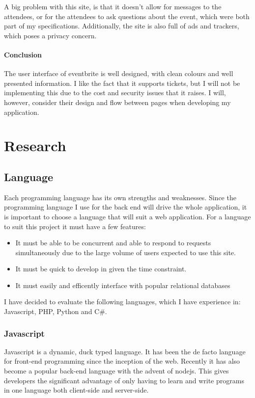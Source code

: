 \documentclass[a4paper,oneside,12pt]{report}
\begin{document}
	A big problem with this site, is that it doesn't allow for messages to the attendees, or for the attendees to ask questions about the event, which were both part of my specifications. Additionally, the site is also full of ads and trackers, which poses a privacy concern.

	\subsubsection{Conclusion}
	The user interface of eventbrite is well designed, with clean colours and well presented information. I like the fact that it supports tickets, but I will not be implementing this due to the cost and security issues that it raises. I will, however, consider their design and flow between pages when developing my application.


	\chapter{Research}

	\section{Language}
	Each programming language has its own strengths and weaknesses. Since the programming language I use for the back end will drive the whole application, it is important to choose a language that will suit a web application. For a language to suit this project it must have a few features:

	\begin{itemize}
		\item It must be able to be concurrent and able to respond to requests simultaneously due to the large volume of users expected to use this site.
		\item It must be quick to develop in given the time constraint.
		\item It must easily and efficently interface with popular relational databases
	\end{itemize}

	I have decided to evaluate the following languages, which I have experience in: Javascript, PHP, Python and C\#.

	\subsection{Javascript}
	Javascript is a dynamic, duck typed language. It has been the de facto language for front-end programming since the inception of the web. Recently it has also become a popular back-end language with the advent of nodejs. This gives developers the significant advantage of only having to learn and write programs in one language both client-side and server-side.
\end{document}
